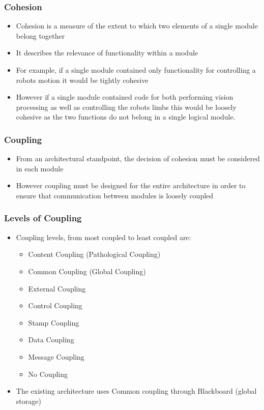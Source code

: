 \documentclass{beamer}
\begin{document}
\begin{frame}
	\frametitle{Cohesion}
	\begin{itemize}
		\item Cohesion is a measure of the extent to which two elements of a single module belong together
		\item It describes the relevance of functionality within a module
		\item For example, if a single module contained only functionality for controlling a robots motion it would be tightly cohesive
		\item However if a single module contained code for both performing vision processing as well as controlling the robots limbs this would be loosely cohesive as the two functions do not belong in a single logical module.
	\end{itemize}
\end{frame}

\begin{frame}
	\frametitle{Coupling}
	\begin{itemize}
		\item From an architectural standpoint, the decision of cohesion must be considered in each module
		\item However coupling must be designed for the entire architecture in order to ensure that communication between modules is loosely coupled
	\end{itemize}
\end{frame}

\begin{frame}
	\frametitle{Levels of Coupling}
	\begin{itemize}
		\item Coupling levels, from most coupled to least coupled are:
		\begin{itemize}
			\item Content Coupling (Pathological Coupling)
			\item Common Coupling (Global Coupling)
			\item External Coupling
			\item Control Coupling
			\item Stamp Coupling
			\item Data Coupling
			\item Message Coupling
			\item No Coupling
		\end{itemize}
		\item The existing architecture uses Common coupling through Blackboard (global storage)
	\end{itemize}
\end{frame}
\end{document}
